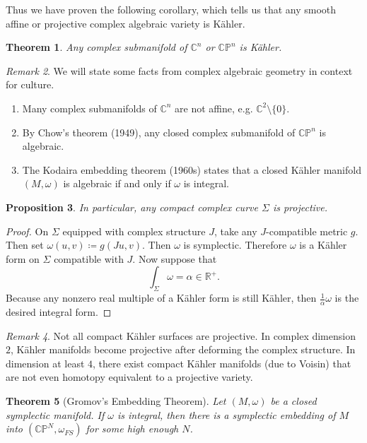 \documentclass[leqno, openany]{memoir}
\newtheorem{thm}{Theorem}[chapter]
\newtheorem{prop}[thm]{Proposition}
\theoremstyle{definition}
\theoremstyle{remark}
\newtheorem{rmk}[thm]{Remark}
\theoremstyle{plain}
\theoremstyle{definition}
\theoremstyle{remark}
\newcommand{\R}{\mathbb{R}}
\newcommand{\C}{\mathbb{C}}
\renewcommand{\P}{\mathbb{P}}
\begin{document}
Thus we have proven the following corollary, which tells us that any smooth affine or projective complex algebraic variety is K\"ahler.

\begin{thm}
    Any complex submanifold of $\C^n$ or $\C\P^n$ is K\"ahler.
\end{thm}

\begin{rmk}
    We will state some facts from complex algebraic geometry in context for culture.
    \begin{enumerate}
        \item Many complex submanifolds of $\C^n$ are not affine, e.g. $\C^2 \setminus \{0\}$.
        \item By Chow's theorem (1949), any closed complex submanifold of $\C\P^n$ is algebraic.
        \item The Kodaira embedding theorem (1960s) states that a closed K\"ahler manifold $(M, \omega)$ is algebraic if and only if $\omega$ is integral.
    \end{enumerate}
\end{rmk}

\begin{prop}
    In particular, any compact complex curve $\Sigma$ is projective.
\end{prop}

\begin{proof}
    On $\Sigma$ equipped with complex structure $J$, take any $J$-compatible metric $g$. Then set $\omega(u,v) \coloneqq g(Ju,v)$. Then $\omega$ is symplectic. Therefore $\omega$ is a K\"ahler form on $\Sigma$ compatible with $J$. Now suppose that
    \[ \int_{\Sigma} \omega = \alpha \in \R^+. \] Because any nonzero real multiple of a K\"ahler form is still K\"ahler, then $\frac{1}{\alpha} \omega$ is the desired integral form.
\end{proof}

\begin{rmk}
    Not all compact K\"ahler surfaces are projective. In complex dimension $2$, K\"ahler manifolds become projective after deforming the complex structure. In dimension at least $4$, there exist compact K\"ahler manifolds (due to Voisin) that are not even homotopy equivalent to a projective variety.
\end{rmk}

\begin{thm}[Gromov's Embedding Theorem]
    Let $(M, \omega)$ be a closed symplectic manifold. If $\omega$ is integral, then there is a symplectic embedding of $M$ into $(\C\P^N, \omega_{FS})$ for some high enough $N$.
\end{thm}
\end{document}
